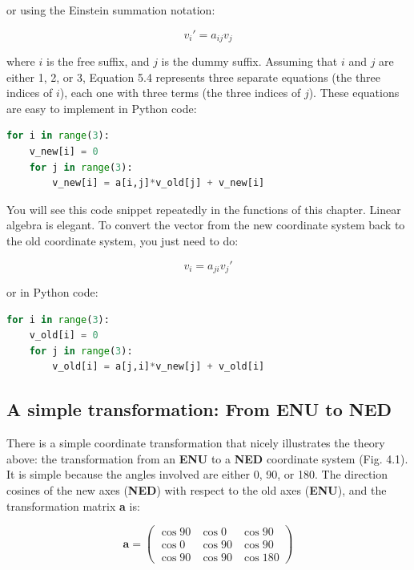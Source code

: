 \documentclass[a4paper , 12pt]{book}
\begin{document}
or using the Einstein summation notation:

\begin{equation}
    v_i\text{$'$}=a_{ij}v_j
\end{equation}

where $i$ is the free suffix, and $j$ is the dummy suffix. Assuming that $i$ and $j$ are either 1, 2, or 3, Equation 5.4 represents three separate equations (the three indices of $i$), each one with three terms (the three indices of $j$). These equations are easy to implement in Python code:

\begin{center}
\begin{lstlisting}[language=Python, frame=single]
for i in range(3):
    v_new[i] = 0
    for j in range(3):
        v_new[i] = a[i,j]*v_old[j] + v_new[i]
\end{lstlisting}
\end{center}

You will see this code snippet repeatedly in the functions of this chapter. Linear algebra is elegant. To convert the vector from the new coordinate system back to the old coordinate system, you just need to do:

\begin{equation}
    v_i=a_{ji}v_j\text{$'$}
\end{equation}

or in Python code:

\begin{center}
\begin{lstlisting}[language=Python, frame=single]
for i in range(3):
    v_old[i] = 0
    for j in range(3):
        v_old[i] = a[j,i]*v_new[j] + v_old[i]
\end{lstlisting}
\end{center}

\subsection{A simple transformation: From \textbf{ENU} to \textbf{NED}}

There is a simple coordinate transformation that nicely illustrates the theory above: the transformation from an \textbf{ENU} to a \textbf{NED} coordinate system (Fig. 4.1). It is simple because the angles involved are either 0, 90, or 180\degree. The direction cosines of the new axes (\textbf{NED}) with respect to the old axes (\textbf{ENU}), and the transformation matrix \textbf{a} is:

\begin{equation}
    \textbf{a}=
    \begin{pmatrix}
    \cos{90} & \cos{0} & \cos{90} \\
    \cos{0} & \cos{90} & \cos{90} \\
    \cos{90} & \cos{90} & \cos{180}
\end{pmatrix}
\end{equation}
\end{document}
